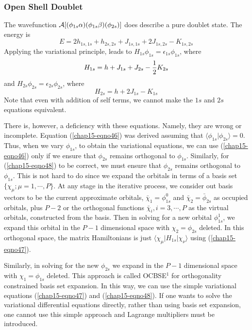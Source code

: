 \subsubsection{Open Shell Doublet}

The wavefunction ${\cal A} [ ( \phi_{1s} \alpha ) (\phi_{1s} 
\beta)(\phi_{2s})]$ does describe a pure doublet state.  The energy is
\begin{equation}
E = 2h_{1s,1s} + h_{2s,2s} + J_{1s,1s} + 2J_{1s,2s} - K_{1s,2s}
\label{chap15-eqno46}
\end{equation}
Applying the variational principle, leads to $H_{1s} \phi_{1s} = 
\epsilon_{1s} \phi_{1s}$, where
\begin{equation}
H_{1s} = h + J_{1s} + J_{2s} - {1 \over 2} K_{2s}
\label{chap15-eqno47}
\end{equation}
and $H_{2s} \phi_{2s} = \epsilon_{2s} \phi_{2s}$, where
\begin{equation}
H_{2s} = h + 2J_{1s} - K_{1s}
\label{chap15-eqno48}
\end{equation}
Note that even with addition of self terms, we cannot make the $1s$ 
and $2s$ equations equivalent.

There is, however, a deficiency with these equations. Namely, they are
wrong or incomplete.  Equation (\ref{chap15-eqno46}) was derived
assuming that $\langle \phi_{1s} | \phi_{2s} \rangle =0$.  Thus, when
we vary $\phi_{1s}$, to obtain the variational equations, we can use
(\ref{chap15-eqno46}) only if we ensure that $\phi_{2s}$ remains
orthogonal to $\phi_{1s}$.  Similarly, for (\ref{chap15-eqno48}) to be
correct, we must ensure that $\phi_{2s}$ remains orthogonal to
$\phi_{1s}$. This is not hard to do since we expand the orbitals in
terms of a basis set $\{
\chi_{\mu}; \mu = 1, \cdots, P \}$.  At any stage in the iterative 
process, we consider out basis vectors to be the
current approximate orbitals, ${\bar{\chi}}_1 = \phi^0_{1s}$ and 
${\bar{\chi}}_2 = {\bar{\phi}}_{2s}$ as occupied orbitals,
plus $P - 2$ or the orthogonal functions ${\bar{\chi}}_i , i = 3 , 
\cdots , P$ as the virtual orbitals, constructed from the basis.  Then 
in solving for a new orbital $\phi^1_{1s}$, we expand
this orbital in the $P - 1$ dimensional space with $\chi_2 = 
\phi_{2s}$ deleted.  In this orthogonal space, the matrix Hamiltonians 
is just $\langle \chi_{\mu} | H_{1s} | \chi_{\nu} \rangle$ using
(\ref{chap15-eqno47}).

Similarly, in solving for the new $\phi_{2s}$ we expand in the $P - 1$
dimensional space with $\chi_1 = \phi_{1s}$ deleted.  This approach is
called OCBSE$^1$ for orthogonality constrained basis set expansion. In
this way, we can use the simple variational equations
(\ref{chap15-eqno47}) and (\ref{chap15-eqno48}).  If one wants to
solve the variational differential equations directly, rather than
using basis set expansion, one cannot use this simple approach and
Lagrange multipliers must be introduced.

